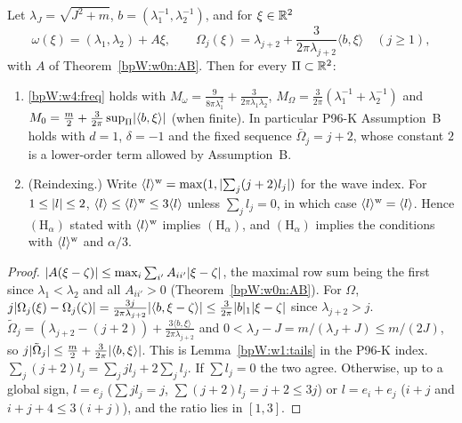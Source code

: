 \begin{lemma}\label{bpW:w4:wave}
Let $\lambda_J=\sqrt{J^2+m}$, $b=(\lambda_1^{-1},\lambda_2^{-1})$, and for $\xi\in\mathbb{R}^2$
\[\omega(\xi)=(\lambda_1,\lambda_2)+A\xi,\qquad\Omega_j(\xi)=\lambda_{j+2}+\frac{3}{2\pi\lambda_{j+2}}\langle b,\xi\rangle\quad(j\ge1),\]
with $A$ of Theorem~\ref{bpW:w0n:AB}. Then for every $\Pi\subset\mathbb{R}^2$:
\begin{enumerate}[label=(\roman*)]
\item \eqref{bpW:w4:freq} holds with $M_\omega=\frac{9}{8\pi\lambda_1^2}+\frac{3}{2\pi\lambda_1\lambda_2}$,
  $M_\Omega=\frac3{2\pi}(\lambda_1^{-1}+\lambda_2^{-1})$ and $M_0=\frac m2+\frac3{2\pi}\sup_\Pi\lvert \langle b,\xi\rangle\rvert$
  (when finite). In particular P96-K Assumption~B holds with $d=1$, $\delta=-1$ and the fixed sequence
  $\bar\Omega_j=j+2$, whose constant $2$ is a lower-order term allowed by Assumption~B.
\item (Reindexing.) Write $\langle l\rangle^{\rm w}=\max(1,\lvert \sum_j(j+2)l_j\rvert)$ for the wave index. For $1\le\lvert l\rvert\le2$,
  $\langle l\rangle\le\langle l\rangle^{\rm w}\le3\langle l\rangle$ unless $\sum_jl_j=0$, in which case $\langle l\rangle^{\rm w}=\langle l\rangle$. Hence
  $(\mathrm H_\alpha)$ stated with $\langle l\rangle^{\rm w}$ implies $(\mathrm H_\alpha)$, and $(\mathrm H_{\alpha})$ implies the
  conditions with $\langle l\rangle^{\rm w}$ and $\alpha/3$.
\end{enumerate}
\end{lemma}

\begin{proof}
\label{stepW:w4:waveLip}
$\lvert A(\xi-\zeta)\rvert\le\max_i\sum_{i'}A_{ii'}\lvert \xi-\zeta\rvert$, the maximal row sum being the first since
$\lambda_1<\lambda_2$ and all $A_{ii'}>0$ (Theorem~\ref{bpW:w0n:AB}). For $\Omega$,
$j\lvert \Omega_j(\xi)-\Omega_j(\zeta)\rvert=\frac{3j}{2\pi\lambda_{j+2}}\lvert \langle b,\xi-\zeta\rangle\rvert\le\frac3{2\pi}\lvert b\rvert_1\lvert \xi-\zeta\rvert$
since $\lambda_{j+2}>j$.
\label{stepW:w4:waveTail}
$\tilde\Omega_j=(\lambda_{j+2}-(j+2))+\frac{3\langle b,\xi\rangle}{2\pi\lambda_{j+2}}$ and
$0<\lambda_J-J=m/(\lambda_J+J)\le m/(2J)$, so $j\lvert \tilde\Omega_j\rvert\le\frac m2+\frac3{2\pi}\lvert \langle b,\xi\rangle\rvert$.
This is Lemma~\ref{bpW:w1:tails} in the P96-K index.
\label{stepW:w4:waveIdx}
$\sum_j(j+2)l_j=\sum_jjl_j+2\sum_jl_j$. If $\sum l_j=0$ the two agree. Otherwise, up to a global sign,
$l=e_j$ ($\sum jl_j=j$, $\sum(j+2)l_j=j+2\le3j$) or $l=e_i+e_j$ ($i+j$ and $i+j+4\le3(i+j)$), and the ratio lies in
$[1,3]$.
\end{proof}

